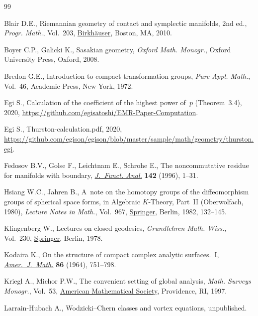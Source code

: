 \begin{thebibliography}{99}
\footnotesize\itemsep=0pt

Blair D.E., Riemannian geometry of contact and symplectic manifolds, 2nd ed., \textit{Progr. Math.}, Vol.~203,
 \href{https://doi.org/10.1007/978-0-8176-4959-3}{Birkh\"auser}, Boston, MA,
 2010.

Boyer C.P., Galicki K., Sasakian geometry, \textit{Oxford Math. Monogr.}, Oxford
 University Press, Oxford, 2008.

Bredon G.E., Introduction to compact transformation groups, \textit{Pure Appl.
 Math.}, Vol.~46, Academic Press, New York, 1972.

Egi S., Calculation of the coefficient of the highest power of~$p$
 ({T}heorem~3.4), 2020,
 \url{https://github.com/egisatoshi/EMR-Paper-Computation}.

Egi S., {T}hurston-calculation.pdf, 2020,
 \url{https://github.com/egison/egison/blob/master/sample/math/geometry/thurston.egi}.

Fedosov B.V., Golse F., Leichtnam E., Schrohe E., The noncommutative residue
 for manifolds with boundary,
 \href{https://doi.org/10.1006/jfan.1996.0142}{\textit{J.~Funct. Anal.}}
 \textbf{142} (1996), 1--31.

Hsiang W.C., Jahren B., A~note on the homotopy groups of the diffeomorphism
 groups of spherical space forms, in Algebraic {$K$}-Theory, {P}art~{II}
 ({O}berwolfach, 1980), \textit{Lecture Notes in Math.}, Vol.~967,
 \href{https://doi.org/10.1007/BFb0061901}{Springer}, Berlin, 1982, 132--145.

Klingenberg W., Lectures on closed geodesics, \textit{Grundlehren Math. Wiss.},
 Vol.~230, \href{https://doi.org/10.1007/978-3-642-61881-9}{Springer}, Berlin,
 1978.

Kodaira K., On the structure of compact complex analytic surfaces.~{I},
 \href{https://doi.org/10.2307/2373157}{\textit{Amer.~J.~Math.}} \textbf{86}
 (1964), 751--798.

Kriegl A., Michor P.W., The convenient setting of global analysis,
 \textit{Math. Surveys Monogr.}, Vol.~53,
 \href{https://doi.org/10.1090/surv/053}{American Mathematical Society},
 Providence, RI, 1997.

Larrain-Hubach A., Wodzicki--{C}hern classes and vortex equations,
 {u}npublished.


\end{thebibliography}
